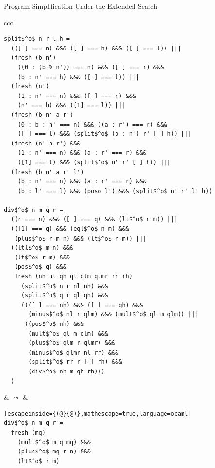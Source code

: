 \documentclass{beamer}
\theoremstyle{definition}
\theoremstyle{plain} %
\begin{document}
\begin{frame}[fragile]{Program Simplification Under the Extended Search}

\begin{center}
\begin{tabular}{ccc}
\newsavebox{\mybox}
\begin{lrbox}{\mybox}
    \begin{lstlisting}[basicstyle=\tiny]
split$^o$ n r l h =
  (([ ] === n) &&& ([ ] === h) &&& ([ ] === l)) |||
  (fresh (b n')
    ((0 : (b % n')) === n) &&& ([ ] === r) &&&
    (b : n' === h) &&& ([ ] === l)) |||
  (fresh (n')
    (1 : n' === n) &&& ([ ] === r) &&&
    (n' === h) &&& ([1] === l)) |||
  (fresh (b n' a r')
    (0 : b : n' === n) &&& ((a : r') === r) &&&
    ([ ] === l) &&& (split$^o$ (b : n') r' [ ] h)) |||
  (fresh (n' a r') &&&
    (1 : n' === n) &&& (a : r' === r) &&&
    ([1] === l) &&& (split$^o$ n' r' [ ] h)) |||
  (fresh (b n' a r' l')
    (b : n' === n) &&& (a : r' === r) &&&
    (b : l' === l) &&& (poso l') &&& (split$^o$ n' r' l' h))

div$^o$ n m q r =
  ((r === n) &&& ([ ] === q) &&& (lt$^o$ n m)) |||
  (([1] === q) &&& (eql$^o$ n m) &&&
   (plus$^o$ r m n) &&& (lt$^o$ r m)) |||
  ((ltl$^o$ m n) &&&
   (lt$^o$ r m) &&&
   (pos$^o$ q) &&&
   fresh (nh hl qh ql qlm qlmr rr rh)
     (split$^o$ n r nl nh) &&&
     (split$^o$ q r ql qh) &&&
     ((([ ] === nh) &&& ([ ] === qh) &&&
       (minus$^o$ nl r qlm) &&& (mult$^o$ ql m qlm)) |||
      ((pos$^o$ nh) &&&
       (mult$^o$ ql m qlm) &&&
       (plus$^o$ qlm r qlmr) &&&
       (minus$^o$ qlmr nl rr) &&&
       (split$^o$ rr r [ ] rh) &&&
       (div$^o$ nh m qh rh)))
  )
    \end{lstlisting}
\end{lrbox}

\scalebox{0.75}{\usebox{\mybox}}

&
$\leadsto$
&
\begin{minipage}{.3\textwidth}
\begin{lstlisting}[escapeinside={(@}{@)},mathescape=true,language=ocaml]
div$^o$ n m q r =
  fresh (mq)
    (mult$^o$ m q mq) &&&
    (plus$^o$ mq r n) &&&
    (lt$^o$ r m)
\end{lstlisting}
\end{minipage}

\end{tabular}
\end{center}

\end{frame}
\end{document}
